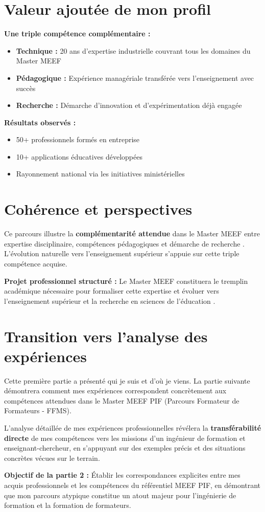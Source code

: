 \section{Valeur ajoutée de mon profil}

\textbf{Une triple compétence complémentaire :}
\begin{itemize}[leftmargin=*]
    \item \textbf{Technique :} 20 ans d'expertise industrielle couvrant tous les domaines du Master MEEF
    \item \textbf{Pédagogique :} Expérience managériale transférée vers l'enseignement avec succès
    \item \textbf{Recherche :} Démarche d'innovation et d'expérimentation déjà engagée
\end{itemize}

\textbf{Résultats observés :}
\begin{itemize}[leftmargin=*]
    \item 50+ professionnels formés en entreprise
    \item 10+ applications éducatives développées
    \item Rayonnement national via les initiatives ministérielles
\end{itemize}

\section{Cohérence et perspectives}

Ce parcours illustre la \textbf{complémentarité attendue} dans le Master MEEF entre expertise disciplinaire, compétences pédagogiques et démarche de recherche \parencite{referentiel_meef}. L'évolution naturelle vers l'enseignement supérieur s'appuie sur cette triple compétence acquise.

\textbf{Projet professionnel structuré :} Le Master MEEF constituera le tremplin académique nécessaire pour formaliser cette expertise et évoluer vers l'enseignement supérieur et la recherche en sciences de l'éducation \parencite{intelligence_artificielle_education,recherche_action_education}.

\section{Transition vers l'analyse des expériences}

Cette première partie a présenté qui je suis et d'où je viens. La partie suivante démontrera comment mes expériences correspondent concrètement aux compétences attendues dans le Master MEEF PIF (Parcours Formateur de Formateurs - FFMS).

L'analyse détaillée de mes expériences professionnelles révélera la \textbf{transférabilité directe} de mes compétences vers les missions d'un ingénieur de formation et enseignant-chercheur, en s'appuyant sur des exemples précis et des situations concrètes vécues sur le terrain.

\textbf{Objectif de la partie 2 :} Établir les correspondances explicites entre mes acquis professionnels et les compétences du référentiel MEEF PIF, en démontrant que mon parcours atypique constitue un atout majeur pour l'ingénierie de formation et la formation de formateurs.
